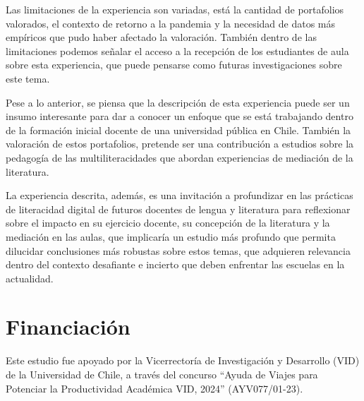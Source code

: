 Las limitaciones de la experiencia son variadas, está la cantidad de
portafolios valorados, el contexto de retorno a la pandemia y la
necesidad de datos más empíricos que pudo haber afectado la valoración.
También dentro de las limitaciones podemos señalar el acceso a la
recepción de los estudiantes de aula sobre esta experiencia, que puede
pensarse como futuras investigaciones sobre este tema.

Pese a lo anterior, se piensa que la descripción de esta experiencia
puede ser un insumo interesante para dar a conocer un enfoque que se
está trabajando dentro de la formación inicial docente de una
universidad pública en Chile. También la valoración de estos
portafolios, pretende ser una contribución a estudios sobre la pedagogía
de las multiliteracidades que abordan experiencias de mediación de la
literatura.

La experiencia descrita, además, es una invitación a profundizar en las
prácticas de literacidad digital de futuros docentes de lengua y
literatura para reflexionar sobre el impacto en su ejercicio docente, su
concepción de la literatura y la mediación en las aulas, que implicaría
un estudio más profundo que permita dilucidar conclusiones más robustas
sobre estos temas, que adquieren relevancia dentro del contexto
desafiante e incierto que deben enfrentar las escuelas en la actualidad.

 \section{Financiación}
Este estudio fue apoyado por la Vicerrectoría de Investigación y Desarrollo (VID) de la Universidad de Chile, a través del concurso “Ayuda de Viajes para Potenciar la Productividad Académica VID, 2024” (AYV077/01-23).